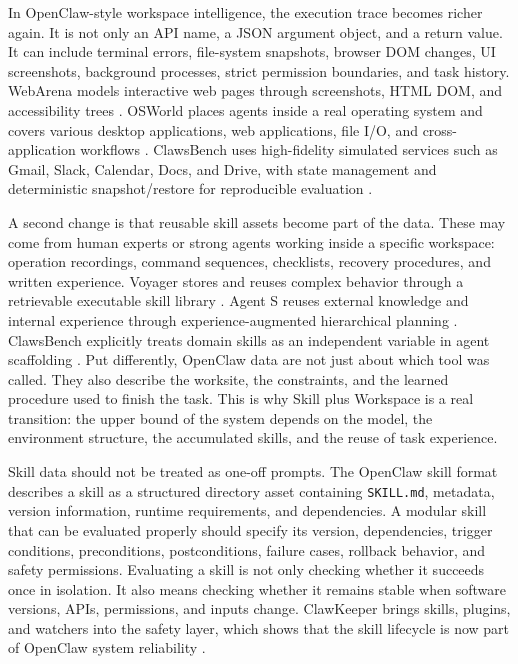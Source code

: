 In OpenClaw-style workspace intelligence, the execution trace becomes richer again. It is not only an API name, a JSON argument object, and a return value. It can include terminal errors, file-system snapshots, browser DOM changes, UI screenshots, background processes, strict permission boundaries, and task history. WebArena models interactive web pages through screenshots, HTML DOM, and accessibility trees \citep{zhou2023webarena}. OSWorld places agents inside a real operating system and covers various desktop applications, web applications, file I/O, and cross-application workflows \citep{xie2024osworld}. ClawsBench uses high-fidelity simulated services such as Gmail, Slack, Calendar, Docs, and Drive, with state management and deterministic snapshot/restore for reproducible evaluation \citep{li2026clawsbench}.

A second change is that reusable skill assets become part of the data. These may come from human experts or strong agents working inside a specific workspace: operation recordings, command sequences, checklists, recovery procedures, and written experience. Voyager stores and reuses complex behavior through a retrievable executable skill library \citep{wang2023voyager}. Agent S reuses external knowledge and internal experience through experience-augmented hierarchical planning \citep{agashe2024agents}. ClawsBench explicitly treats domain skills as an independent variable in agent scaffolding \citep{li2026clawsbench}. Put differently, OpenClaw data are not just about which tool was called. They also describe the worksite, the constraints, and the learned procedure used to finish the task. This is why Skill plus Workspace is a real transition: the upper bound of the system depends on the model, the environment structure, the accumulated skills, and the reuse of task experience.

Skill data should not be treated as one-off prompts. The OpenClaw skill format describes a skill as a structured directory asset containing \texttt{SKILL.md}, metadata, version information, runtime requirements, and dependencies. A modular skill that can be evaluated properly should specify its version, dependencies, trigger conditions, preconditions, postconditions, failure cases, rollback behavior, and safety permissions. Evaluating a skill is not only checking whether it succeeds once in isolation. It also means checking whether it remains stable when software versions, APIs, permissions, and inputs change. ClawKeeper brings skills, plugins, and watchers into the safety layer, which shows that the skill lifecycle is now part of OpenClaw system reliability \citep{liu2026clawkeeper}.

